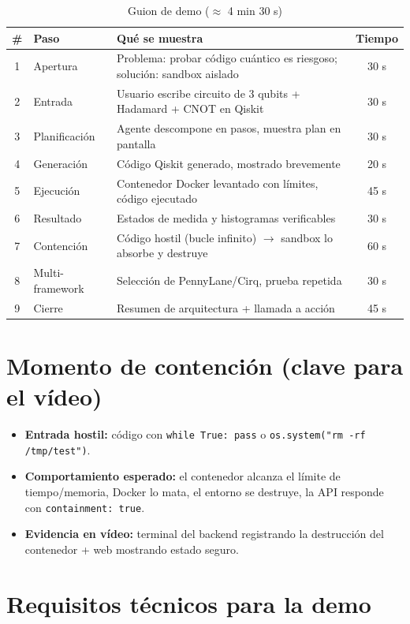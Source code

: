 \documentclass[11pt,a4paper]{article}
\begin{document}
\begin{table}[h]
\centering
\begin{tabular}{clp{6cm}c}
\toprule
\# & Paso & Qué se muestra & Tiempo \\
\midrule
1 & Apertura & Problema: probar código cuántico es riesgoso; solución: sandbox aislado & 30 s \\
2 & Entrada & Usuario escribe circuito de 3 qubits + Hadamard + CNOT en Qiskit & 30 s \\
3 & Planificación & Agente descompone en pasos, muestra plan en pantalla & 30 s \\
4 & Generación & Código Qiskit generado, mostrado brevemente & 20 s \\
5 & Ejecución & Contenedor Docker levantado con límites, código ejecutado & 45 s \\
6 & Resultado & Estados de medida y histogramas verificables & 30 s \\
7 & Contención & Código hostil (bucle infinito) $\rightarrow$ sandbox lo absorbe y destruye & 60 s \\
8 & Multi-framework & Selección de PennyLane/Cirq, prueba repetida & 30 s \\
9 & Cierre & Resumen de arquitectura + llamada a acción & 45 s \\
\bottomrule
\end{tabular}
\caption{Guion de demo ($\approx$ 4 min 30 s)}
\end{table}

\section{Momento de contención (clave para el vídeo)}

\begin{itemize}
    \item \textbf{Entrada hostil:} código con \texttt{while True: pass} o
    \texttt{os.system("rm -rf /tmp/test")}.
    \item \textbf{Comportamiento esperado:} el contenedor alcanza el límite de
    tiempo/memoria, Docker lo mata, el entorno se destruye, la API responde con
    \texttt{containment: true}.
    \item \textbf{Evidencia en vídeo:} terminal del backend registrando la
    destrucción del contenedor + web mostrando estado seguro.
\end{itemize}

\section{Requisitos técnicos para la demo}
\end{document}
